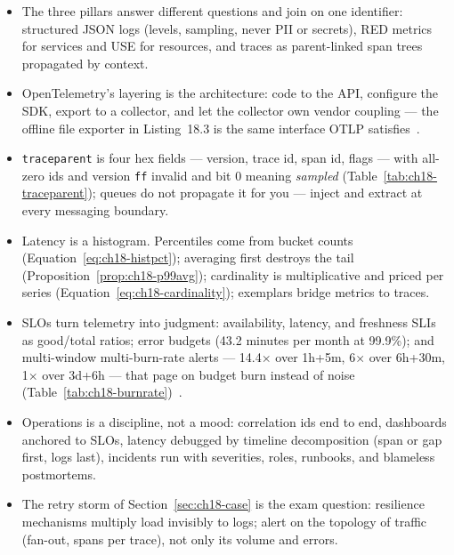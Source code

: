\begin{itemize}
  \item The three pillars answer different questions and join on one
        identifier: structured JSON logs (levels, sampling, never PII or
        secrets), RED metrics for services and USE for resources, and
        traces as parent-linked span trees propagated by context.
  \item OpenTelemetry's layering is the architecture: code to the API,
        configure the SDK, export to a collector, and let the collector own
        vendor coupling --- the offline file exporter in Listing~18.3 is
        the same interface OTLP satisfies~\cite{opentelemetrydocs}.
  \item \texttt{traceparent} is four hex fields --- version, trace id,
        span id, flags --- with all-zero ids and version \texttt{ff}
        invalid and bit 0 meaning \emph{sampled}
        (Table~\ref{tab:ch18-traceparent}); queues do not propagate it for
        you --- inject and extract at every messaging boundary.
  \item Latency is a histogram. Percentiles come from bucket counts
        (Equation~\eqref{eq:ch18-histpct}); averaging first destroys the
        tail (Proposition~\ref{prop:ch18-p99avg}); cardinality is
        multiplicative and priced per series
        (Equation~\eqref{eq:ch18-cardinality}); exemplars bridge metrics to
        traces.
  \item SLOs turn telemetry into judgment: availability, latency, and
        freshness SLIs as good/total ratios; error budgets (43.2 minutes
        per month at 99.9\%); and multi-window multi-burn-rate alerts ---
        14.4$\times$ over 1h+5m, 6$\times$ over 6h+30m, 1$\times$ over
        3d+6h --- that page on budget burn instead of noise
        (Table~\ref{tab:ch18-burnrate})~\cite{beyer2016sre}.
  \item Operations is a discipline, not a mood: correlation ids end to end,
        dashboards anchored to SLOs, latency debugged by timeline
        decomposition (span or gap first, logs last), incidents run with
        severities, roles, runbooks, and blameless postmortems.
  \item The retry storm of Section~\ref{sec:ch18-case} is the exam
        question: resilience mechanisms multiply load invisibly to logs;
        alert on the topology of traffic (fan-out, spans per trace), not
        only its volume and errors.
\end{itemize}

